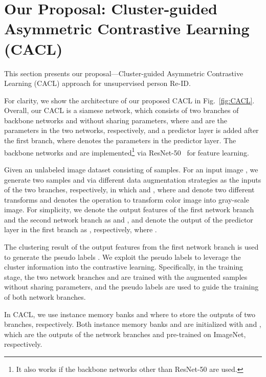 \documentclass[journal]{IEEEtran}
\begin{document}
 










\section{Our Proposal: Cluster-guided Asymmetric Contrastive Learning (CACL)} 
\label{sec:our-proposal}

This section  presents our proposal---Cluster-guided Asymmetric Contrastive Learning (CACL) approach for unsupervised person Re-ID. 



For clarity, we show the architecture of our proposed CACL in Fig.~\ref{fig:CACL}. Overall, our CACL is a siamese network, which consists of two branches of backbone networks  and  without sharing parameters, 
where  and  are the parameters in the two networks, respectively, and a predictor layer  is added after the first branch, where  denotes the parameters in the predictor layer. The backbone networks   and  are implemented\footnote{It also works if the backbone networks other than ResNet-50 are used.} via ResNet-50~\cite{he:CVPR16resnet} for feature learning. 




Given an unlabeled image dataset  consisting of   samples. 
For an input image , we generate two samples  and  via different data augmentation strategies as the inputs of the two branches, respectively, in which  and ,  where  and  denote two different transforms and  denotes the operation to transform color image into gray-scale image. 
For simplicity, we denote the output features of the first network branch and the second network branch as  and , and denote the output of the predictor layer in the first branch as , respectively, where . 






The clustering result of the output features  from the first network branch is used to generate the pseudo labels . We exploit the pseudo labels to leverage the cluster information into the contrastive learning.  Specifically, in the training stage, the two network branches  and  are trained with the augmented samples  without sharing parameters, and the pseudo labels   
are used to guide the training of both network branches. 


In CACL, we use instance memory banks  and  where  to store the outputs of two branches, respectively. Both instance memory banks  and  are initialized with  and , which are the outputs of the network branches  and  pre-trained on ImageNet, respectively.
\end{document}
